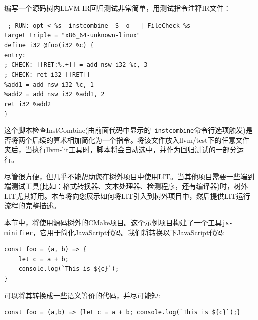 编写一个源码树内LLVM IR回归测试非常简单，用测试指令注释IR文件：

\begin{tcolorbox}[colback=white,colframe=black]
\tt
{}
; RUN: opt < \%s -instcombine -S -o - | FileCheck \%s \\
target triple = "x86\_64-unknown-linux" \\
define i32 @foo(i32 \%c) \{ \\
\hspace*{0.3cm}entry: \\
\hspace*{0.3cm}; CHECK: [[RET:\%.+]] = add nsw i32 \%c, 3 \\
\hspace*{0.3cm}; CHECK: ret i32 [[RET]] \\
\hspace*{0.3cm}\%add1 = add nsw i32 \%c, 1 \\
\hspace*{0.3cm}\%add2 = add nsw i32 \%add1, 2 \\
\hspace*{0.3cm}ret i32 \%add2 \\
\}
\end{tcolorbox}

这个脚本检查InstCombine(由前面代码中显示的\texttt{-instcombine}命令行选项触发)是否将两个后续的算术相加简化为一个指令。将该文件放入llvm/test下的任意文件夹后，当执行llvm-lit工具时，脚本将会自动选中，并作为回归测试的一部分运行。

尽管很方便，但几乎不能帮助您在树外项目中使用LIT。当其他项目需要一些端到端测试工具(比如：格式转换器、文本处理器、检测程序，还有编译器)时，树外LIT尤其好用。本节将向您展示如何将LIT引入到树外项目中，然后提供LIT运行流程的完整描述。


本节中，将使用源码树外的CMake项目。这个示例项目构建了一个工具\texttt{js-minifier}，它用于简化JavaScript代码。我们将转换以下JavaScript代码:

\begin{lstlisting}[style=styleJavaScript]
const foo = (a, b) => {
	let c = a + b;
	console.log(`This is ${c}`);
}
\end{lstlisting}

可以将其转换成一些语义等价的代码，并尽可能短:

\begin{lstlisting}[style=styleJavaScript]
const foo = (a,b) => {let c = a + b; console.log(`This is ${c}`);}
\end{lstlisting}

